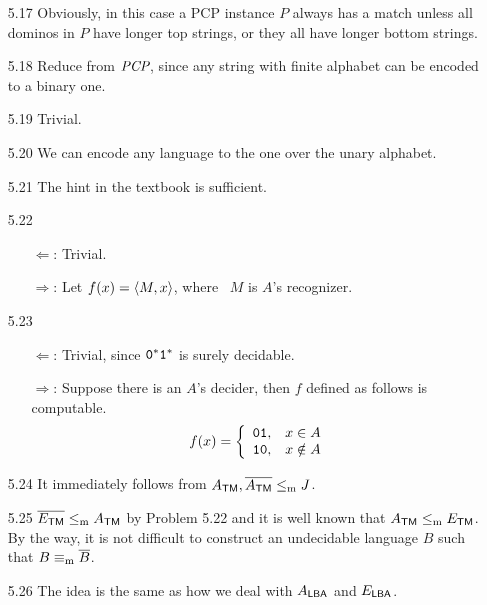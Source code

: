\begin{itemize}
	\item[5.17]
	Obviously, in this case a PCP instance $P$ always has a match unless all dominos in $P$ have longer top strings, or they all have longer bottom strings.
	
	\item[5.18]
	Reduce from $\IT{PCP}$, since any string with finite alphabet can be encoded to a binary one.
	
	\item[5.19]
	Trivial.
	
	\item[5.20]
	We can encode any language to the one over the unary alphabet.
	
	\item[5.21]
	The hint in the textbook is sufficient.
	
	\item[5.22]
	\begin{itemize}
		\item[$\Leftarrow$:] Trivial.
		\item[$\Rightarrow$:] Let $f(x) = \Bra{M, x}$, where \TM\ $M$ is $A$'s recognizer. 
	\end{itemize}

	\item[5.23]
	\begin{itemize}
		\item[$\Leftarrow$:] Trivial, since $\TT{0}^*\TT{1}^*$ is surely decidable.
		\item[$\Rightarrow$:] Suppose there is an $A$'s decider, then $f$ defined as follows is computable.
		\[
			f(x) = 
			\left\{
				\begin{array}{ll}
					\TT{01}, & x \in A \\
					\TT{10}, & x \notin A
				\end{array}
			\right.
		\]
	\end{itemize}

	\item[5.24]
	It immediately follows from $A_{\TM}, \overline{A_{\TM}} \Leqm J$.
	
	\item[5.25]
	$\overline{E_{\TM}} \Leqm A_{\TM}$ by Problem 5.22 and it is well known that $A_{\TM} \Leqm E_{\TM}$. By the way, it is not difficult to construct an undecidable language $B$ such that $B \equiv_{\RM{m}} \overline{B}$.
	
	\item[5.26]
	The idea is the same as how we deal with $A_{\LBA}$ and $E_{\LBA}$.
	

\end{itemize}
